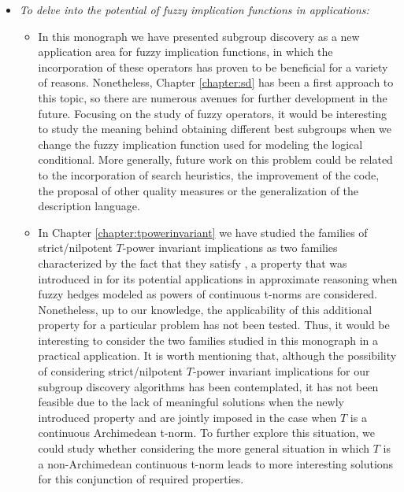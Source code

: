 \begin{itemize}
\item \textit{To delve into the potential of fuzzy implication functions in applications:}
\begin{itemize}
	\item In this monograph we have presented subgroup discovery as a new application area for fuzzy implication functions, in which the incorporation of these operators has proven to be beneficial for a variety of reasons. Nonetheless, Chapter \ref{chapter:sd} has been a first approach to this topic, so there are numerous avenues for further development in the future. Focusing on the study of fuzzy operators, it would be interesting to study the meaning behind obtaining different best subgroups when we change the fuzzy implication function used for modeling the logical conditional. More generally, future work on this problem could be related to the incorporation of search heuristics, the improvement of the code, the proposal of other quality measures or the generalization of the description language.
	\item In Chapter \ref{chapter:tpowerinvariant} we have studied the families of strict/nilpotent $T$-power invariant implications as two families characterized by the fact that they satisfy \PIT, a property that was introduced in \cite{Massanet2017} for its potential applications in approximate reasoning when fuzzy hedges modeled as powers of continuous t-norms are considered. Nonetheless, up to our knowledge, the applicability of this additional property for a particular problem has not been tested. Thus, it would be interesting to consider the two families studied in this monograph in a practical application. It is worth mentioning that, although the possibility of considering strict/nilpotent $T$-power invariant implications for our subgroup discovery algorithms has been contemplated, it has not been feasible due to the lack of meaningful solutions when the newly introduced property \MTC and \PIT are jointly imposed in the case when $T$ is a continuous Archimedean t-norm. To further explore this situation, we could study whether considering the more general situation in which $T$ is a non-Archimedean continuous t-norm leads to more interesting solutions for this conjunction of required properties.
\end{itemize}
\end{itemize}